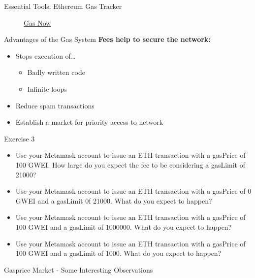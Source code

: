 \documentclass[]{beamer}
\begin{document}
\begin{frame}{Essential Tools: Ethereum Gas Tracker}
\begin{figure}
\begin{minipage}{0.45\textwidth}
  			\caption*{\footnotesize \href{https://www.gasnow.org}{\link Gas Now}}			
		\end{minipage}
	\end{figure}
\end{frame}

\begin{frame}{Advantages of the Gas System}
	\textbf{Fees help to secure the network:}
	\begin{itemize}
		\item Stops execution of…
		\begin{itemize}
			\item Badly written code
			\item Infinite loops
		\end{itemize}
		\item Reduce spam transactions
		\item Establish a market for priority access to network
	\end{itemize}
	
\begin{exercise}{Exercise 3} %
\begin{itemize}
	\item Use your Metamask account to issue an ETH transaction with a gasPrice of 100 GWEI. How large do you expect the fee to be considering a gasLimit of 21000?
	\item Use your Metamask account to issue an ETH transaction with a gasPrice of 0 GWEI and a gasLimit 0f 21000. What do you expect to happen?
	\item Use your Metamask account to issue an ETH transaction with a gasPrice of 100 GWEI and a gasLimit of 1000000. What do you expect to happen?
	\item Use your Metamask account to issue an ETH transaction with a gasPrice of 100 GWEI and a gasLimit of 1000. What do you expect to happen?
\end{itemize}
\end{exercise}
\end{frame}

\begin{frame}{Gasprice Market - Some Interesting Observations}
\end{frame}
\end{document}
